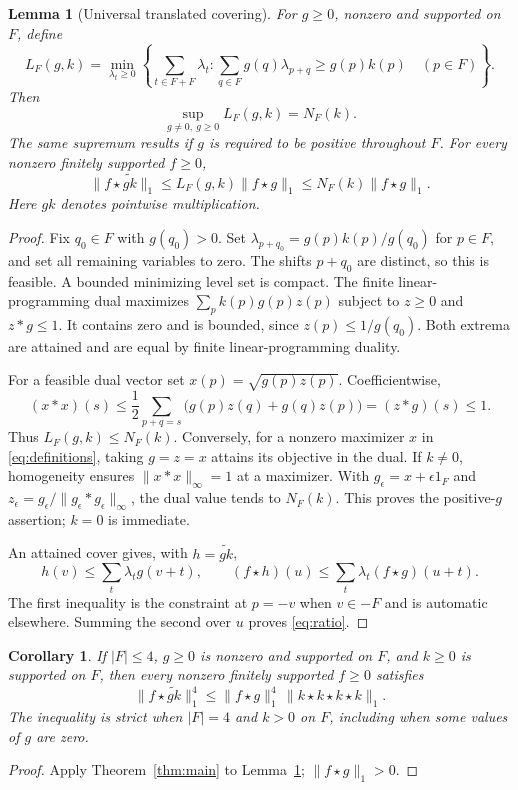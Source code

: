 \documentclass[11pt]{article}
\newtheorem{lemma}[theorem]{Lemma}
\newtheorem{corollary}[theorem]{Corollary}
\theoremstyle{remark}
\numberwithin{equation}{section}
\begin{document}
\begin{lemma}[Universal translated covering]\label{lem:cover}
For $g\ge0$, nonzero and supported on $F$, define
\begin{equation}\label{eq:cover}
 L_F(g,k)=\min_{\lambda_t\ge0}
 \left\{\sum_{t\in F+F}\lambda_t:
 \sum_{q\in F}g(q)\lambda_{p+q}\ge g(p)k(p)\quad(p\in F)\right\}.
\end{equation}
Then
\begin{equation}\label{eq:universal}
 \sup_{g\ne0,\ g\ge0}L_F(g,k)=N_F(k).
\end{equation}
The same supremum results if $g$ is required to be positive throughout $F$.
For every nonzero finitely supported $f\ge0$,
\begin{equation}\label{eq:ratio}
 \|f\star\widetilde{gk}\|_1
 \le L_F(g,k)\|f\star g\|_1
 \le N_F(k)\|f\star g\|_1.
\end{equation}
Here $gk$ denotes pointwise multiplication.
\end{lemma}
\begin{proof}
Fix $q_0\in F$ with $g(q_0)>0$. Set
$\lambda_{p+q_0}=g(p)k(p)/g(q_0)$ for $p\in F$, and set all remaining
variables to zero. The shifts $p+q_0$ are distinct, so this is feasible.
A bounded minimizing level set is compact. The finite linear-programming
dual maximizes $\sum_pk(p)g(p)z(p)$ subject to
$z\ge0$ and $z*g\le1$. It contains zero and is bounded, since
$z(p)\le1/g(q_0)$. Both extrema are attained and are equal by finite
linear-programming duality.

For a feasible dual vector set $x(p)=\sqrt{g(p)z(p)}$. Coefficientwise,
\[
 (x*x)(s)\le\frac12\sum_{p+q=s}
       \bigl(g(p)z(q)+g(q)z(p)\bigr)=(z*g)(s)\le1.
\]
Thus $L_F(g,k)\le N_F(k)$. Conversely, for a nonzero maximizer $x$ in
\eqref{eq:definitions}, taking $g=z=x$ attains its objective in the dual.
If $k\ne0$, homogeneity ensures $\|x*x\|_\infty=1$ at a maximizer.
With $g_\epsilon=x+\epsilon1_F$ and
$z_\epsilon=g_\epsilon/\|g_\epsilon*g_\epsilon\|_\infty$, the dual value
tends to $N_F(k)$. This proves the positive-$g$ assertion; $k=0$ is immediate.

An attained cover gives, with $h=\widetilde{gk}$,
\[
 h(v)\le\sum_t\lambda_tg(v+t),\qquad
 (f\star h)(u)\le\sum_t\lambda_t(f\star g)(u+t).
\]
The first inequality is the constraint at $p=-v$ when $v\in-F$ and is
automatic elsewhere. Summing the second over $u$ proves \eqref{eq:ratio}.
\end{proof}

\begin{corollary}\label{cor:h4}
If $|F|\le4$, $g\ge0$ is nonzero and supported on $F$, and $k\ge0$ is
supported on $F$, then every nonzero finitely supported $f\ge0$ satisfies
\[
 \|f\star\widetilde{gk}\|_1^4
 \le \|f\star g\|_1^4\,\|k\star k\star k\star k\|_1.
\]
The inequality is strict when $|F|=4$ and $k>0$ on $F$, including when
some values of $g$ are zero.
\end{corollary}
\begin{proof}
Apply Theorem~\ref{thm:main} to Lemma~\ref{lem:cover};
$\|f\star g\|_1>0$.
\end{proof}
\end{document}
